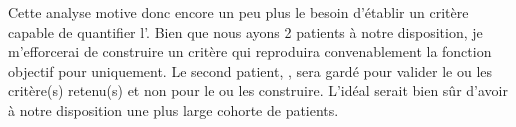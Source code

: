 \documentclass[main.tex]{subfiles}
\begin{document}
Cette analyse motive donc encore un peu plus le besoin d'établir un critère capable de quantifier l'\hetero. Bien que nous ayons 2 patients à notre disposition, je m'efforcerai de construire un critère qui reproduira convenablement la fonction objectif pour \Nber uniquement. Le second patient, \Chen, sera gardé pour valider le ou les critère(s) retenu(s) et non pour le ou les construire. L'idéal serait bien sûr d'avoir à notre disposition une plus large cohorte de patients.


\end{document}
